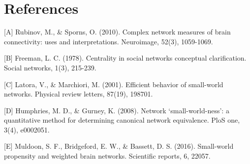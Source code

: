 \documentclass[11pt, a4paper]{article}
\begin{document}
\section{References}
[A] Rubinov, M., \& Sporns, O. (2010). Complex network measures of brain connectivity: uses and interpretations. Neuroimage, 52(3), 1059-1069.

[B] Freeman, L. C. (1978). Centrality in social networks conceptual clarification. Social networks, 1(3), 215-239.

[C] Latora, V., \& Marchiori, M. (2001). Efficient behavior of small-world networks. Physical review letters, 87(19), 198701.

[D] Humphries, M. D., \& Gurney, K. (2008). Network ‘small-world-ness’: a quantitative method for determining canonical network equivalence. PloS one, 3(4), e0002051.

[E] Muldoon, S. F., Bridgeford, E. W., \& Bassett, D. S. (2016). Small-world propensity and weighted brain networks. Scientific reports, 6, 22057.
\end{document}
